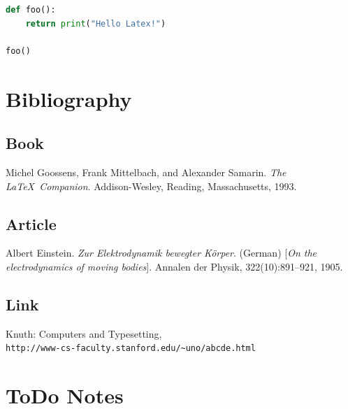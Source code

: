 \documentclass[12pt]{article}
\begin{document}
\begin{lstlisting}[language=Python, caption=Python example]
def foo():
    return print("Hello Latex!")

foo()
\end{lstlisting}


\section{Bibliography}

\subsection{Book}
\begin{thebibliography}{1}
Michel Goossens, Frank Mittelbach, and Alexander Samarin. 
\textit{The \LaTeX\ Companion}. 
Addison-Wesley, Reading, Massachusetts, 1993.

\subsection{Article}
Albert Einstein. 
\textit{Zur Elektrodynamik bewegter K{\"o}rper}. (German) 
[\textit{On the electrodynamics of moving bodies}]. 
Annalen der Physik, 322(10):891–921, 1905.

\subsection{Link}
Knuth: Computers and Typesetting,
\\\texttt{http://www-cs-faculty.stanford.edu/\~{}uno/abcde.html}
\end{thebibliography}

\section{ToDo Notes}
\end{document}
